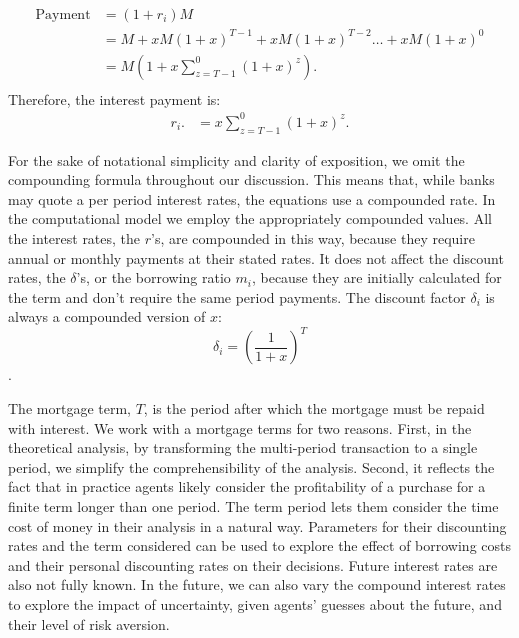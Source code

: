 \begin{align*}
\text{Payment} &= (1+r_i)M                                 \\ 
    &= M + xM(1+x)^{T-1}+ xM(1+x)^{T-2}\dots + xM(1+x)^{0} \\
    &= M\left(1+ x\sum_{z=T-1}^0(1+x)^{z}\right).          \\ 
\end{align*}
Therefore, the interest payment is:
\begin{align*}
r_i.   &=x\sum_{z=T-1}^0(1+x)^{z}.
\end{align*}

For the sake of notational simplicity and clarity of exposition,  we omit the compounding formula throughout our discussion. This means that, while banks may quote a per period interest rates, the equations use a compounded rate. In the computational model we employ the appropriately compounded values. All %
 the interest rates, the $r$'s, are compounded in this way, because they require annual or monthly payments at their stated rates.
 It does not affect the discount rates, the $\delta$'s, or the borrowing ratio $m_i$, because they are initially calculated for the term and don't require the same period payments.
 The discount factor $\delta_i$ is always a compounded version of $x$:
 \[\delta_i=\left(\frac{1}{1+x}\right)^T\].

 The {mortgage term}, $T$, is the period after which the mortgage must be repaid with interest. We work with a mortgage terms for two reasons. First, in the theoretical analysis, by transforming the multi-period transaction to a single period, we simplify the comprehensibility of the analysis. Second, it reflects the fact that in practice agents  likely consider the profitability of a purchase for a finite term longer than one period. The term period lets them consider the time cost of money in their analysis in a natural way. Parameters for their discounting rates and the term considered can be used to explore the effect of borrowing costs and their personal discounting rates on their decisions. Future interest rates are also not fully known. In the future, we can also vary the compound interest rates to explore the impact of uncertainty, given agents' guesses about the future, and their level of risk aversion.






